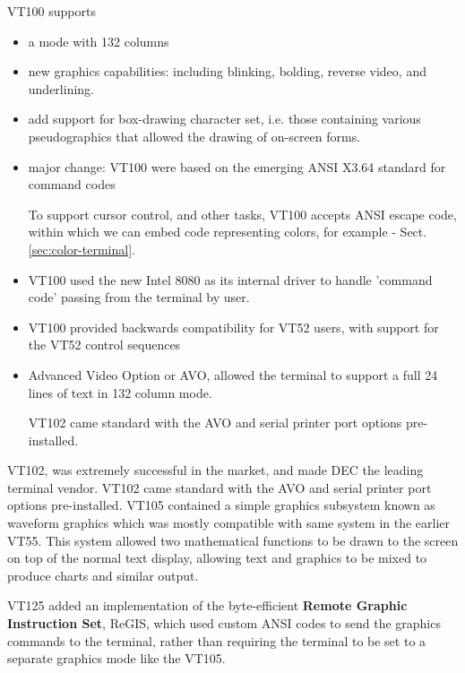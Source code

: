VT100 supports 
\begin{itemize}
  \item a mode with 132 columns
  
  \item new graphics capabilities: including blinking, bolding, reverse video,
  and underlining.
  
  \item add support for box-drawing character set, i.e. those containing various
  pseudographics that allowed the drawing of on-screen forms.
  
  \item major change: VT100 were based on the emerging ANSI X3.64 standard for
  command codes

To support cursor control, and other tasks, VT100 accepts ANSI escape code,
within which we can embed code representing colors, for example -
Sect.\ref{sec:color-terminal}.

  
  \item VT100 used the new Intel 8080 as its internal driver to handle 'command
  code' passing from the terminal by user.
  
  \item  VT100 provided backwards compatibility for VT52 users, with support for
  the VT52 control sequences
  
  \item  Advanced Video Option or AVO, allowed the terminal to support a full 24
  lines of text in 132 column mode.
  
  VT102 came standard with the AVO and serial printer port options
  pre-installed.
\end{itemize}


VT102, was extremely successful in the market, and made DEC the leading terminal
vendor.  VT102 came standard with the AVO and serial printer port options
pre-installed. VT105 contained a simple graphics subsystem known as waveform
graphics which was mostly compatible with same system in the earlier VT55. This
system allowed two mathematical functions to be drawn to the screen on top of
the normal text display, allowing text and graphics to be mixed to produce
charts and similar output.

VT125 added an implementation of the byte-efficient {\bf Remote Graphic
Instruction Set}, ReGIS, which used custom ANSI codes to send the graphics
commands to the terminal, rather than requiring the terminal to be set to a
separate graphics mode like the VT105.

